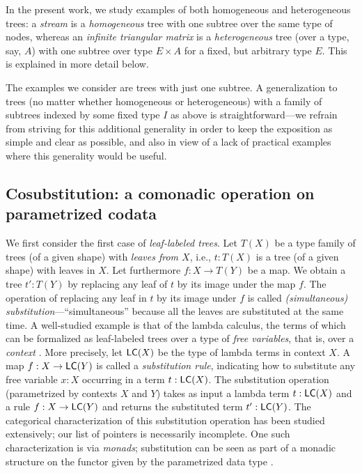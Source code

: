 \documentclass[a4paper,USenglish]{lipics}
\newcommand{\parencite}[1]{\cite{#1}}
\begin{document}
In the present work, we study examples of both homogeneous and heterogeneous trees: a \emph{stream} is a \emph{homogeneous} tree with one subtree over the same type of nodes,
whereas an \emph{infinite triangular matrix} is a \emph{heterogeneous} tree (over a type, say, $A$) with one subtree over type $E\times A$ for a fixed, but arbitrary type $E$.
This is explained in more detail below.

The examples we consider are trees with just one subtree. A generalization to trees (no matter whether homogeneous or heterogeneous) with a family of subtrees indexed by some fixed type $I$ as above is straightforward---we refrain from striving for this additional generality in order to keep the exposition as simple and clear as possible, and also in view of a lack of practical examples where this generality would be useful.

 

 \subsection{Cosubstitution: a comonadic operation on parametrized codata}\label{sec:cosubst}



We first consider the first case of \emph{leaf-labeled trees}.
 Let $T(X)$ be a type family of trees (of a given shape) with \emph{leaves from $X$}, i.e., $t: T(X)$ is a tree (of a given shape) with leaves in $X$.
 Let furthermore $f : X \to T(Y)$ be a map. We obtain a tree $t' : T(Y)$ by replacing any leaf of $t$ by its image under the map $f$.
 The operation of replacing any leaf in $t$ by its image under $f$ is called \emph{(simultaneous) substitution}---\enquote{simultaneous} because all the leaves are 
 substituted at the same time. 
 A well-studied example is that of the lambda calculus, the terms of which can be formalized as leaf-labeled trees over a type of \emph{free variables}, that is,
 over a \emph{context} \parencite{alt_reus}.
 More precisely, let $\mathsf{LC}(X)$ be the type of lambda terms in context $X$. A map $f : X \to \mathsf{LC}(Y)$ is called a \emph{substitution rule}, indicating how to substitute any 
 free variable $x:X$ occurring in a term $t : \mathsf{LC}(X)$. 
 The substitution operation (parametrized by contexts $X$ and $Y$) takes as input a lambda term $t : \mathsf{LC}(X)$ and a rule $f : X \to \mathsf{LC}(Y)$ and returns the substituted term
 $t' : \mathsf{LC}(Y)$.
 The categorical characterization of this substitution operation
 has been studied extensively; our list of pointers \parencite{alt_reus, fpt, Power:2007:ASS:1230146.1230276, Tanaka:2005:UCF:1088454.1088457,
 DBLP:journals/iandc/HirschowitzM10, DBLP:conf/fossacs/AltenkirchCU10, ahrens_relmonads} is necessarily incomplete.
 One such characterization is via \emph{monads}; substitution can be seen as part of a monadic structure on the functor 
 given by the parametrized data type \parencite{alt_reus, 
 DBLP:journals/iandc/HirschowitzM10, DBLP:conf/fossacs/AltenkirchCU10, ahrens_relmonads}.
 
\end{document}
